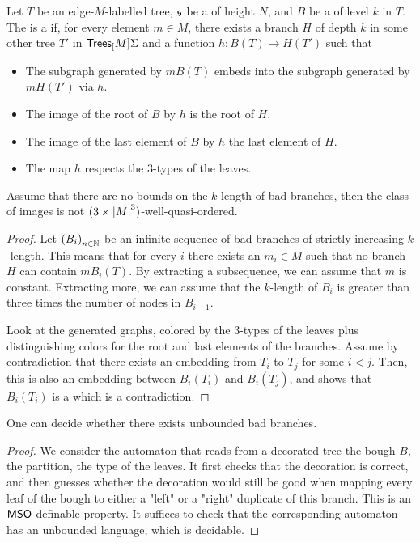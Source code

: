 \begin{definition}
    \label{good-bough:def}
    Let $T$ be an edge-$M$-labelled tree, $\mathfrak{s}$ be a 
    of height $N$, and $B$ be a  of level $k$ in $T$.
    The  is a  if, for every element $m \in M$,
    there exists a branch $H$ of depth $k$ in some other tree $T'$ in $\mathsf{Trees}_{[}M]{\Sigma}$
    and a function $h \colon B(T) \to H(T')$ such that
    \begin{itemize}
        \item The subgraph generated by $m B(T)$ embeds into the subgraph generated by $m H(T')$ via $h$.
        \item The image of the root of $B$ by $h$ is the root of $H$.
        \item The image of the last element of $B$ by $h$ the last element of $H$.
        \item The map $h$ respects the $3$-types of the leaves.
    \end{itemize}
\end{definition}

\begin{lemma}
    Assume that there are no bounds on the $k$-length of bad branches, then 
    the class of images is not $(3 \times \left| M \right|^3)$-well-quasi-ordered.
\end{lemma}
\begin{proof}
    Let $\seqof{B_i}$ be an infinite sequence of bad branches of strictly increasing $k$-length.
    This means that for every $i$ there exists an $m_i \in M$ such that
    no branch $H$ can contain $m B_i(T)$. By extracting a subsequence, we can assume that $m$ is constant.
    Extracting more, we can assume that the $k$-length of $B_i$ is greater than three times the
    number of nodes in $B_{i-1}$.

    Look at the generated graphs, colored by the $3$-types of the leaves plus
    distinguishing colors for the root and last elements of the branches. Assume by contradiction that
    there exists an embedding from $T_i$ to $T_j$ for some $i < j$. Then,
    this is also an embedding between $B_i(T_i)$ and $B_i(T_j)$, and
    shows that $B_i(T_i)$ is a  which is a contradiction.
\end{proof}

\begin{lemma}
    One can decide whether there exists unbounded
    bad branches.
\end{lemma}
\begin{proof}
    We consider the automaton that reads from a decorated tree
    the bough $B$, the partition, the type of the leaves. 
    It first checks that the decoration is correct, and then
    guesses whether the decoration would still be good when
    mapping every leaf of the bough to either a "left" or a "right"
    duplicate of this branch. This is an $\mathsf{MSO}$-definable property.
    It suffices to check that the corresponding automaton
    has an unbounded language, which is decidable.
\end{proof}


